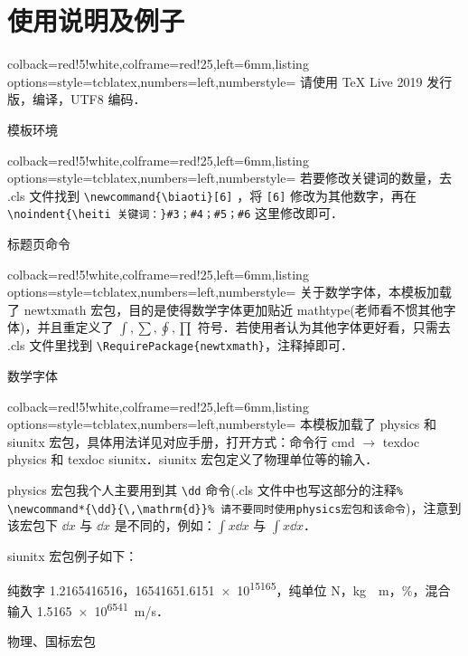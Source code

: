 \documentclass{JXUSTmodeling}
\begin{document}
    \section{使用说明及例子}\label{sec:5}
    \begin{example}[htbp]
        \centering
        \begin{tcblisting}{colback=red!5!white,colframe=red!25,left=6mm,listing options={style=tcblatex,numbers=left,numberstyle=\tiny\color{red!75!black}}}
请使用 TeX Live 2019 发行版，\XeLaTeX 编译，UTF8 编码．
    \end{tcblisting}
        \caption{模板环境}\label{exam:0}
    \end{example}

    \begin{example}[htbp]
        \centering
        \begin{tcblisting}{colback=red!5!white,colframe=red!25,left=6mm,listing options={style=tcblatex,numbers=left,numberstyle=\tiny\color{red!75!black}}}
若要修改关键词的数量，去 .cls 文件找到 \verb|\newcommand{\biaoti}[6]| ，将 \verb|[6]| 修改为其他数字，再在 \verb|\noindent{\heiti 关键词：}#3；#4；#5；#6| 这里修改即可．
\end{tcblisting}
        \caption{标题页命令}\label{exam:1}
    \end{example}

    \begin{example}[htbp]
        \centering
        \begin{tcblisting}{colback=red!5!white,colframe=red!25,left=6mm,listing options={style=tcblatex,numbers=left,numberstyle=\tiny\color{red!75!black}}}
关于数学字体，本模板加载了 newtxmath 宏包，目的是使得数学字体更加贴近 mathtype(老师看不惯其他字体)，并且重定义了 $\int,\sum,\oint,\prod$ 符号．若使用者认为其他字体更好看，只需去 .cls 文件里找到 \verb|\RequirePackage{newtxmath}|，注释掉即可．
        \end{tcblisting}
        \caption{数学字体}\label{exam:2}
    \end{example}

    \begin{example}[htbp]
        \centering
        \begin{tcblisting}{colback=red!5!white,colframe=red!25,left=6mm,listing options={style=tcblatex,numbers=left,numberstyle=\tiny\color{red!75!black}}}
本模板加载了 physics 和 siunitx 宏包，具体用法详见对应手册，打开方式：命令行 cmd $\to$ texdoc physics 和 texdoc siunitx．siunitx 宏包定义了物理单位等的输入．

physics 宏包我个人主要用到其 \verb|\dd| 命令(.cls 文件中也写这部分的注释\verb|% \newcommand*{\dd}{\,\mathrm{d}}% 请不要同时使用physics宏包和该命令|)，注意到该宏包下 $\dd{x}$ 与 $\dd x$ 是不同的，例如：$\int x \dd{x}$ 与 $\int x \dd x$．

siunitx 宏包例子如下：

纯数字 \num{1.2165416516}，\num{16541651.6151e15165}，纯单位 \si{N}，\si{kg \cdot m}，\si{\percent}，混合输入 \SI{1.5165e6541}{m/s}．
\end{tcblisting}
        \caption{物理、国标宏包}\label{exam:3}
    \end{example}
\end{document}
